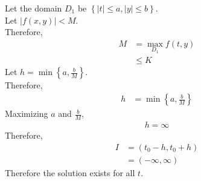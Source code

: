 \documentclass[fleqn, a4paper, 11pt, oneside]{amsart}
\theoremstyle{definition}
\theoremstyle{theorem}
\begin{document}
\begin{solution}
	Let the domain $D_1$ be $\left\{ |t| \le a , |y| \le b \right\}$.\\
	Let $|f(x,y)| < M$.\\
	Therefore,
	\begin{align*}
		M & = \max\limits_{D_1} f(t,y) \\
                  & \le K
	\end{align*}
	Let $h = \min \left\{ a, \frac{b}{M} \right\}$.\\
	Therefore,
	\begin{align*}
		h & = \min \left\{ a, \frac{b}{M} \right\}
	\end{align*}
	Maximizing $a$ and $\frac{b}{M}$,
	\begin{align*}
		h = \infty
	\end{align*}
	Therefore,
	\begin{align*}
		I &= (t_0 - h , t_0 + h)\\
		&= (-\infty, \infty)
	\end{align*}
	Therefore the solution exists for all $t$.
\end{solution}
\end{document}
